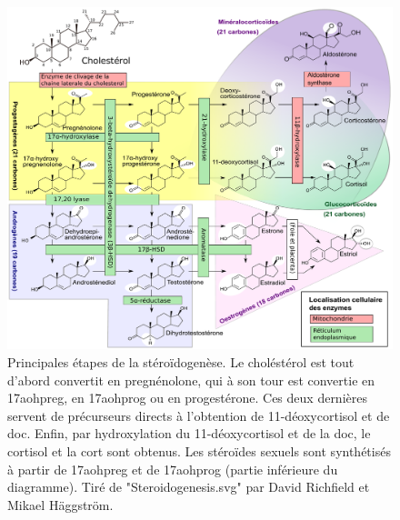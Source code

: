 \begin{figure}[!htbp]
\centering
\vspace{1\baselineskip}
\includegraphics[width=\textwidth]
{Figures/steroidogenesis/steroidogenesis.pdf}
\caption[Principales étapes de la stéroidogenèse]
{
Principales étapes de la stéroïdogenèse.
Le choléstérol est tout d'abord convertit en pregnénolone, qui à son tour est convertie en \gls{17aohpreg}, en \gls{17aohprog} ou en progestérone.
Ces deux dernières servent de précurseurs directs à l'obtention de 11-déoxycortisol et de \gls{doc}.
Enfin, par hydroxylation du 11-déoxycortisol et de la \gls{doc}, le cortisol et la \gls{cort} sont obtenus.
Les stéroïdes sexuels sont synthétisés à partir de \gls{17aohpreg} et de \gls{17aohprog} (partie inférieure du diagramme).
Tiré de "Steroidogenesis.svg" par David Richfield et Mikael Häggström.
}
\label{fig:steroidogenesis}
\end{figure}